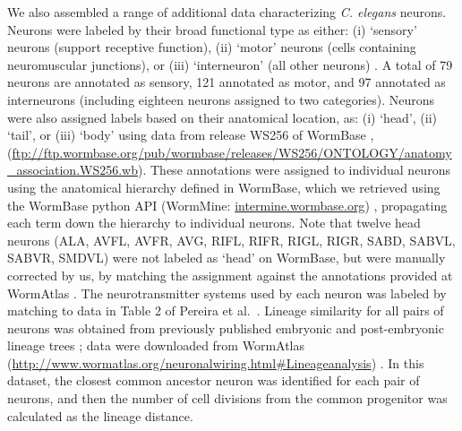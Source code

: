 \documentclass[10pt,letterpaper]{article}
\begin{document}
We also assembled a range of additional data characterizing \emph{C. elegans} neurons.
Neurons were labeled by their broad functional type as either:
(i) `sensory' neurons (support receptive function),
(ii) `motor' neurons (cells containing neuromuscular junctions), or
(iii) `interneuron' (all other neurons) \cite{White:1986tx}.
A total of 79 neurons are annotated as sensory, 121 annotated as motor, and 97 annotated as interneurons (including eighteen neurons assigned to two categories).
Neurons were also assigned labels based on their anatomical location, as:
(i) `head', (ii) `tail', or (iii) `body' using data from release WS256 of WormBase \cite{Harris:2009kd}, (\url{ftp://ftp.wormbase.org/pub/wormbase/releases/WS256/ONTOLOGY/anatomy_association.WS256.wb}).
These annotations were assigned to individual neurons using the anatomical hierarchy defined in WormBase, which we retrieved using the WormBase python API (WormMine: \url{intermine.wormbase.org}) \cite{Harris:2009kd}, propagating each term down the hierarchy to individual neurons.
Note that twelve head neurons (ALA, AVFL, AVFR, AVG, RIFL, RIFR, RIGL, RIGR, SABD, SABVL, SABVR, SMDVL) were not labeled as `head' on WormBase, but were manually corrected by us, by matching the assignment against the annotations provided at WormAtlas \cite{WormAtlas}.
The neurotransmitter systems used by each neuron was labeled by matching to data in Table 2 of Pereira et al.~\cite{Pereira:2015er}.
Lineage similarity for all pairs of neurons was obtained from previously published embryonic and post-embryonic lineage trees \cite{Sulston1977, Sulston1983}; data were downloaded from WormAtlas (\url{http://www.wormatlas.org/neuronalwiring.html#Lineageanalysis}) \cite{WormAtlas}.
In this dataset, the closest common ancestor neuron was identified for each pair of neurons, and then the number of cell divisions from the common progenitor was calculated as the lineage distance.
\end{document}
